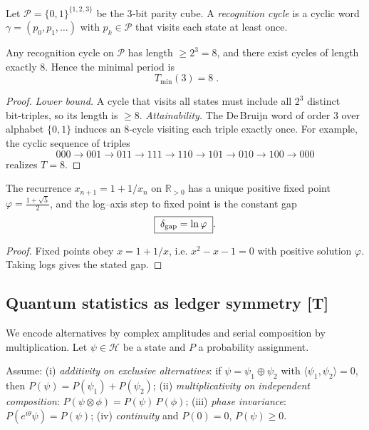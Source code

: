 \documentclass[11pt]{article}
\begin{document}
\begin{definition}
Let \(\mathcal P=\{0,1\}^{\{1,2,3\}}\) be the 3‑bit parity cube. A \emph{recognition cycle} is a cyclic word \(\gamma=(p_0,p_1,\dots)\) with \(p_k\in\mathcal P\) that visits each state at least once.
\end{definition}

\begin{theorem}
\label{thm:eight-tick}
Any recognition cycle on \(\mathcal P\) has length \(\ge 2^{3}=8\), and there exist cycles of length exactly \(8\). Hence the minimal period is
\[
\boxed{\;T_{\min}(3)=8\;}.
\]
\end{theorem}

\begin{proof}
\emph{Lower bound.} A cycle that visits all states must include all \(2^{3}\) distinct bit‑triples, so its length is \(\ge8\). \emph{Attainability.} The De Bruijn word of order \(3\) over alphabet \(\{0,1\}\) induces an 8‑cycle visiting each triple exactly once. For example, the cyclic sequence of triples
\[
000\to 001\to 011\to 111\to 110\to 101\to 010\to 100\to 000
\]
realizes \(T=8\).
\end{proof}

\begin{proposition}
\label{prop:phi}
The recurrence \(x_{n+1}=1+1/x_{n}\) on \(\mathbb R_{>0}\) has a unique positive fixed point \(\varphi=\frac{1+\sqrt5}{2}\), and the log–axis step to fixed point is the constant gap
\[
\boxed{\;\delta_{\rm gap}=\ln\varphi\;}.
\]
\end{proposition}

\begin{proof}
Fixed points obey \(x=1+1/x\), i.e. \(x^{2}-x-1=0\) with positive solution \(\varphi\). Taking logs gives the stated gap.
\end{proof}

\subsection{Quantum statistics as ledger symmetry \texorpdfstring{[$\mathbf T$]}{[T]}}
\label{subsec:quantum-stat}

We encode alternatives by complex amplitudes and serial composition by multiplication. Let \(\psi\in\mathcal H\) be a state and \(P\) a probability assignment.

\begin{definition}
Assume:
(i) \emph{additivity on exclusive alternatives}: if \(\psi=\psi_1\oplus\psi_2\) with \(\langle\psi_1,\psi_2\rangle=0\), then \(P(\psi)=P(\psi_1)+P(\psi_2)\);
(ii) \emph{multiplicativity on independent composition}: \(P(\psi\otimes\phi)=P(\psi)\,P(\phi)\);
(iii) \emph{phase invariance}: \(P(e^{i\theta}\psi)=P(\psi)\);
(iv) \emph{continuity} and \(P(0)=0\), \(P(\psi)\ge0\).
\end{definition}
\end{document}
